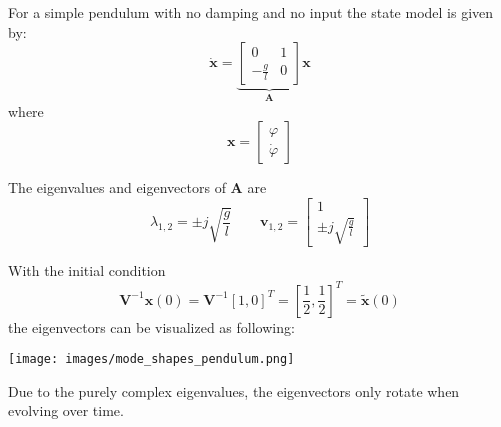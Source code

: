 \begin{examplesection}
    For a simple pendulum with no damping and no input the state model is given by:
    \begin{equation*}
        \dot{\mathbf{x}}=\underbrace{\begin{bmatrix}
                0            & 1 \\
                -\frac{g}{l} & 0
            \end{bmatrix}}_{\mathbf{A}}\mathbf{x}
    \end{equation*}
    where
    \begin{equation*}
        \mathbf{x}=\begin{bmatrix}
            \varphi \\
            \dot{\varphi}
        \end{bmatrix}
    \end{equation*}

    The eigenvalues and eigenvectors of $\mathbf{A}$ are
    \begin{equation*}
        \lambda_{1,2} = \pm j \sqrt{\frac{g}{l}} \qquad \mathbf{v}_{1,2}=\begin{bmatrix}
            1 \\
            \pm j \sqrt{\frac{g}{l}}
        \end{bmatrix}
    \end{equation*}

    With the initial condition
    \noindent\begin{equation*}
        \mathbf{V}^{-1}\mathbf{x}(0) = \mathbf{V}^{-1}{[1, 0]}^T = {\left[\frac{1}{2}, \frac{1}{2}\right]}^T = \tilde{\mathbf{x}}(0)
    \end{equation*}
    the eigenvectors can be visualized as following:

    \texttt{[image: images/mode\_shapes\_pendulum.png]}

    Due to the purely complex eigenvalues, the eigenvectors only rotate when evolving over time.


\end{examplesection}
